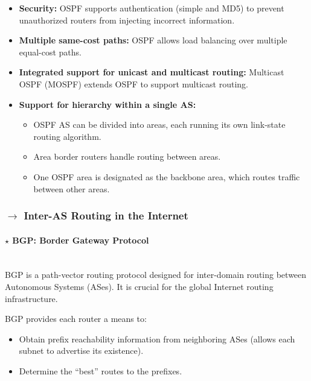 \begin{itemize}
    \item \textbf{Security:} OSPF supports authentication (simple and MD5) to prevent unauthorized routers from injecting incorrect information.
    \item \textbf{Multiple same-cost paths:} OSPF allows load balancing over multiple equal-cost paths.
    \item \textbf{Integrated support for unicast and multicast routing:} Multicast OSPF (MOSPF) extends OSPF to support multicast routing.
    \item \textbf{Support for hierarchy within a single AS:}
    \begin{itemize}[noitemsep, nolistsep]
        \item OSPF AS can be divided into areas, each running its own link-state routing algorithm.
        \item Area border routers handle routing between areas.
        \item One OSPF area is designated as the backbone area, which routes traffic between other areas.
    \end{itemize}
\end{itemize}

\clearpage
\subsubsection[4.3.3 Inter-AS Routing in the Internet]{$\rightarrow$ Inter-AS Routing in the Internet}
\label{subsubsec:inter-as}

\paragraph[4.3.3.1 BGP: Border Gateway Protocol]{$\pmb{\star}$ BGP: Border Gateway Protocol}\mbox{}\\[4pt]
BGP is a path-vector routing protocol designed for inter-domain routing between Autonomous Systems (ASes). It is crucial for the global Internet routing infrastructure.

\vspace{1 em}
\noindent BGP provides each router a means to:
\begin{itemize}
    \item Obtain prefix reachability information from neighboring ASes (allows each subnet to advertise its existence).
    \item Determine the “best” routes to the prefixes.
\end{itemize}


